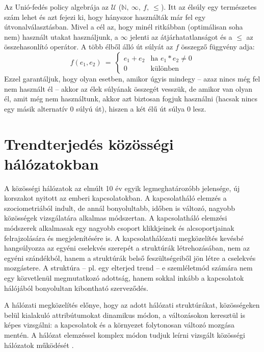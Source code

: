       Az Unió-fedés policy algebrája az $\mathcal{U}$ ($\mathbb{N},~\infty,~f,~\leq$). Itt az élsúly egy természetes szám lehet és azt fejezi ki, hogy hányszor használták már fel egy útvonalválasztásban. Mivel a cél az, hogy minél ritkábban (optimálisan soha nem) használt utakat használjunk, a $\infty$ jelenti az átjárhatatlanságot és a $\leq$ az összehasonlító operátor. A több élből álló út súlyát az $f$ összegző függvény adja:
      $$f(e_1,e_2)~=~
      \begin{cases}
        e_1+e_2 & \text{ha } e_1*e_2 \neq 0 \\
        0 & \text{különben}
      \end{cases}$$
      Ezzel garantáljuk, hogy olyan esetben, amikor úgyis mindegy -- azaz nincs még fel nem használt él -- akkor az élek súlyának összegét vesszük, de amikor van olyan él, amit még nem használtunk, akkor azt biztosan fogjuk használni (hacsak nincs egy másik alternatív 0 súlyú út), hiszen a két élű út súlya 0 lesz.\newpage

  \section{Trendterjedés közösségi hálózatokban}

  A közösségi hálózatok az elmúlt 10 év egyik legmeghatározóbb jelensége, új korszakot nyitott az emberi kapcsolatokban. A kapcsolatháló elemzés a szociometriából indult, de annál bonyolultabb, időben is változó, nagyobb közösségek vizsgálatára alkalmas módszertan. A kapcsolatháló elemzési módszerek alkalmasak egy nagyobb csoport klikkjeinek és alcsoportjainak felrajzolására és megjelenítésére is. A kapcsolathálózati megközelítés kevésbé hangsúlyozza az egyéni cselekvés szerepét a struktúrák létrehozásában, nem az egyéni szándékból, hanem a struktúrák belső feszültségeiből jön létre a cselekvés mozgástere. A struktúra -- pl. egy elterjed trend -- e szemléletmód számára nem egy közvetlenül megmutatkozó adottság, hanem sokkal inkább a kapcsolatok hálójából bonyolultan kibontható szerveződés.

  A hálózati megközelítés előnye, hogy az adott hálózati struktúrákat, közösségeken belül kialakuló attribútumokat dinamikus módon, a változásokon keresztül is képes vizsgálni: a kapcsolatok és a környezet folytonosan változó mozgása mentén. A hálózat elemzéssel komplex módon tudjuk leírni vizsgált közösségi hálózatok működését \cite{Csaba_Pal}.\\

